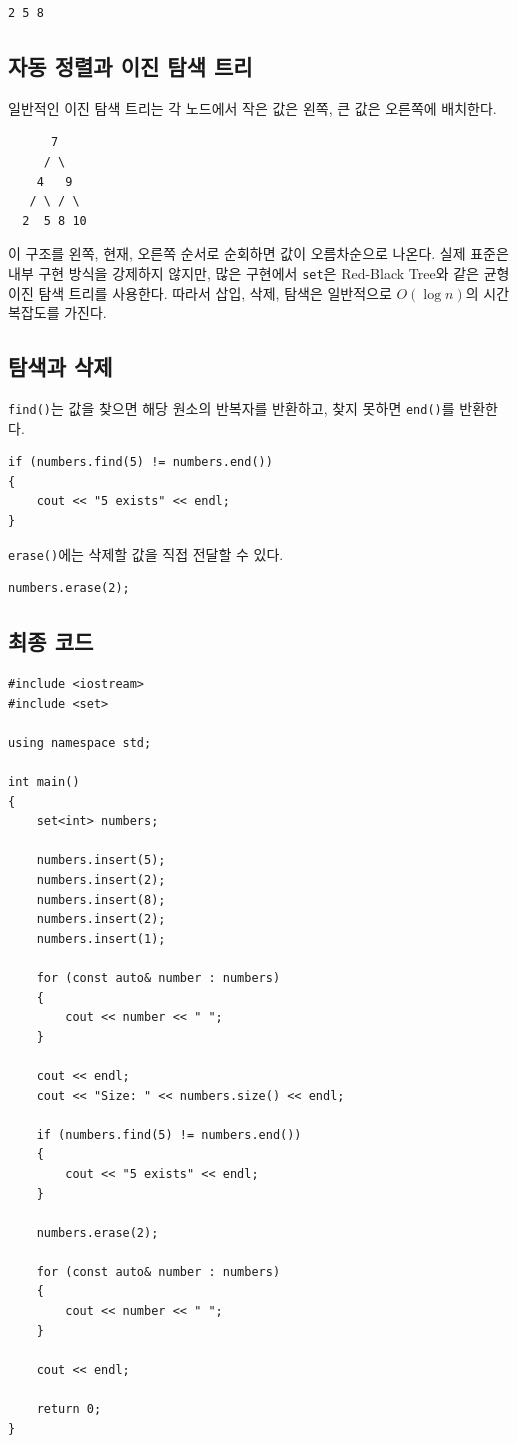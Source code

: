 \documentclass[11pt,a4paper]{article}
\begin{document}
\begin{verbatim}
2 5 8
\end{verbatim}

\subsection{자동 정렬과 이진 탐색 트리}
일반적인 이진 탐색 트리는 각 노드에서 작은 값은 왼쪽, 큰 값은 오른쪽에 배치한다.

\begin{verbatim}
      7
     / \
    4   9
   / \ / \
  2  5 8 10
\end{verbatim}

이 구조를 왼쪽, 현재, 오른쪽 순서로 순회하면 값이 오름차순으로 나온다. 실제 표준은 내부 구현 방식을 강제하지 않지만, 많은 구현에서 \texttt{set}은 Red-Black Tree와 같은 균형 이진 탐색 트리를 사용한다. 따라서 삽입, 삭제, 탐색은 일반적으로 $O(\log n)$의 시간 복잡도를 가진다.

\subsection{탐색과 삭제}
\texttt{find()}는 값을 찾으면 해당 원소의 반복자를 반환하고, 찾지 못하면 \texttt{end()}를 반환한다.

\begin{lstlisting}
if (numbers.find(5) != numbers.end())
{
    cout << "5 exists" << endl;
}
\end{lstlisting}

\texttt{erase()}에는 삭제할 값을 직접 전달할 수 있다.

\begin{lstlisting}
numbers.erase(2);
\end{lstlisting}

\subsection{최종 코드}
\begin{lstlisting}
#include <iostream>
#include <set>

using namespace std;

int main()
{
    set<int> numbers;

    numbers.insert(5);
    numbers.insert(2);
    numbers.insert(8);
    numbers.insert(2);
    numbers.insert(1);

    for (const auto& number : numbers)
    {
        cout << number << " ";
    }

    cout << endl;
    cout << "Size: " << numbers.size() << endl;

    if (numbers.find(5) != numbers.end())
    {
        cout << "5 exists" << endl;
    }

    numbers.erase(2);

    for (const auto& number : numbers)
    {
        cout << number << " ";
    }

    cout << endl;

    return 0;
}
\end{lstlisting}
\end{document}
